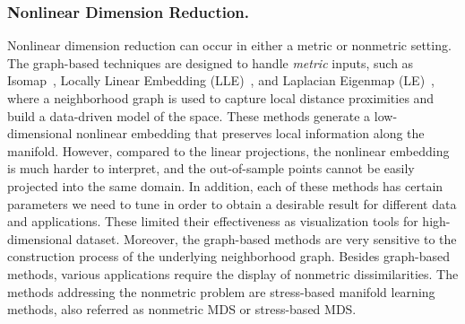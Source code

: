 \subsubsection{Nonlinear Dimension Reduction.}
Nonlinear dimension reduction can occur in  either a metric or nonmetric setting.
%
The graph-based techniques are designed to handle \textit{metric} inputs, such as Isomap~\cite{TenenbaumSilvaLangford2000}, Locally Linear Embedding (LLE)~\cite{RoweisSaul2000}, and Laplacian Eigenmap (LE)~\cite{BelkinNiyogi2003}, where a neighborhood graph is used to capture local distance proximities and build a data-driven model of the space.
%
%
These methods generate a low-dimensional nonlinear embedding that preserves local information along the manifold.
%
However, compared to the linear projections, the nonlinear embedding is much harder to interpret, and the out-of-sample points cannot be easily projected into the same domain.
%
In addition, each of these methods has certain parameters we need to tune in order to obtain a desirable result for different data and applications.
%
These limited their effectiveness as visualization tools for high-dimensional dataset.
%
Moreover, the graph-based methods are very sensitive to the construction process of the underlying neighborhood graph.
%
%
Besides graph-based methods, various applications require the display of nonmetric dissimilarities.
%
The methods addressing the nonmetric problem are stress-based manifold learning methods, also referred as nonmetric MDS or stress-based MDS.

